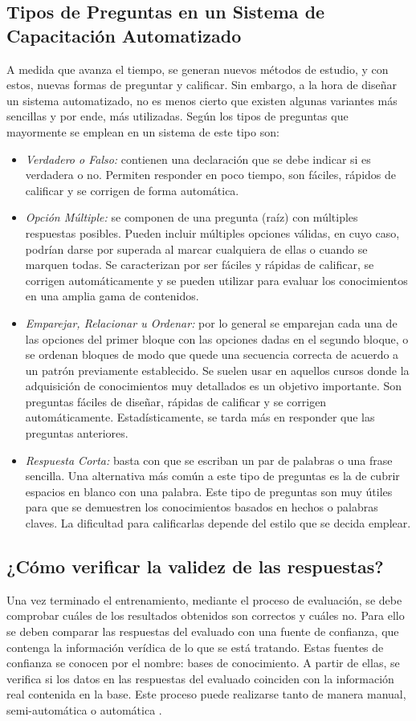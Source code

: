 \subsection{Tipos de Preguntas en un Sistema de Capacitación Automatizado}
A medida que avanza el tiempo, se generan nuevos métodos de estudio, y con estos, nuevas formas de preguntar y calificar. Sin embargo, a la hora de diseñar un sistema automatizado, no es menos cierto que existen algunas variantes más sencillas y por ende, más utilizadas. Según \cite{referencia12} los tipos de preguntas que mayormente se emplean en un sistema de este tipo son:
\begin{itemize}
\item \textsl{Verdadero o Falso:} contienen una declaración que se debe indicar si es verdadera o no. Permiten responder en poco tiempo, son fáciles, rápidos de calificar y se corrigen de forma automática.
\item \textsl{Opción Múltiple:} se componen de una pregunta (raíz) con
múltiples respuestas posibles. Pueden incluir múltiples opciones válidas, en cuyo caso, podrían darse por superada al marcar cualquiera de ellas o cuando se marquen todas. Se caracterizan por ser fáciles y rápidas de calificar, se
corrigen automáticamente y se pueden utilizar para evaluar los conocimientos en una amplia gama de contenidos.
\item \textsl{Emparejar, Relacionar u Ordenar:} por lo general se emparejan cada una de las opciones del primer bloque con las opciones dadas en el segundo bloque, o se ordenan bloques de modo que quede una secuencia correcta de acuerdo a un patrón previamente establecido. Se suelen usar en aquellos cursos donde la adquisición de conocimientos muy detallados es un objetivo importante. Son preguntas fáciles de diseñar, rápidas de calificar y se corrigen
automáticamente. Estadísticamente, se tarda más en responder que las preguntas anteriores.
\item \textsl{Respuesta Corta:} basta con que se escriban un par de palabras o una frase sencilla. Una alternativa más común a este tipo de preguntas es la de cubrir espacios en blanco con una palabra. Este tipo de preguntas son muy útiles para que se demuestren los conocimientos basados en hechos o palabras claves. La dificultad para calificarlas depende del estilo que se decida emplear.
\end{itemize}

\subsection{¿Cómo verificar la validez de las respuestas?}
Una vez terminado el entrenamiento, mediante el proceso de evaluación, se debe comprobar cuáles de los resultados obtenidos son correctos y cuáles no. Para ello se deben comparar las respuestas del evaluado con una fuente de confianza, que contenga la información verídica de lo que se está tratando. Estas fuentes de confianza se conocen por el nombre: bases de conocimiento.
A partir de ellas, se verifica si los datos en las respuestas del evaluado coinciden con la información real contenida en la base. Este proceso puede realizarse tanto de manera manual, semi-automática o automática \cite{Christmann2022}.

